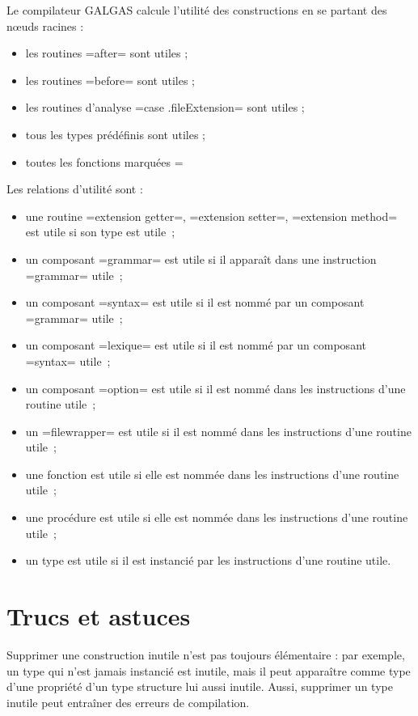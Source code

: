 Le compilateur GALGAS calcule l'utilité des constructions en se partant des nœuds racines :
\begin{itemize}
  \item les routines \ggs=after= sont utiles ;
  \item les routines \ggs=before= sont utiles ;
  \item les routines d'analyse \ggs=case .fileExtension= sont utiles ;
  \item tous les types prédéfinis sont utiles ;
  \item toutes les fonctions marquées \ggs=%
\end{itemize}

Les relations d'utilité sont :
\begin{itemize}
  \item une routine \ggs=extension getter=, \ggs=extension setter=, \ggs=extension method= est utile si son type est utile~;
  \item un composant \ggs=grammar= est utile si il apparaît dans une instruction \ggs=grammar= utile~;
  \item un composant \ggs=syntax= est utile si il est nommé par un composant \ggs=grammar= utile~;
  \item un composant \ggs=lexique= est utile si il est nommé par un composant \ggs=syntax= utile~;
  \item un composant \ggs=option= est utile si il est nommé dans les instructions d'une routine utile~;
  \item un  \ggs=filewrapper= est utile si il est nommé dans les instructions d'une routine utile~;
  \item une fonction est utile si elle est nommée dans les instructions d'une routine utile~;
  \item une procédure est utile si elle est nommée dans les instructions d'une routine utile~;
  \item un type est utile si il est instancié par les instructions d'une routine utile.
\end{itemize}



\section{Trucs et astuces}

Supprimer une construction inutile n'est pas toujours élémentaire : par exemple, un type qui n'est jamais instancié est inutile, mais il peut apparaître comme type d'une propriété d'un type structure lui aussi inutile. Aussi, supprimer un type inutile peut entraîner des erreurs de compilation.

